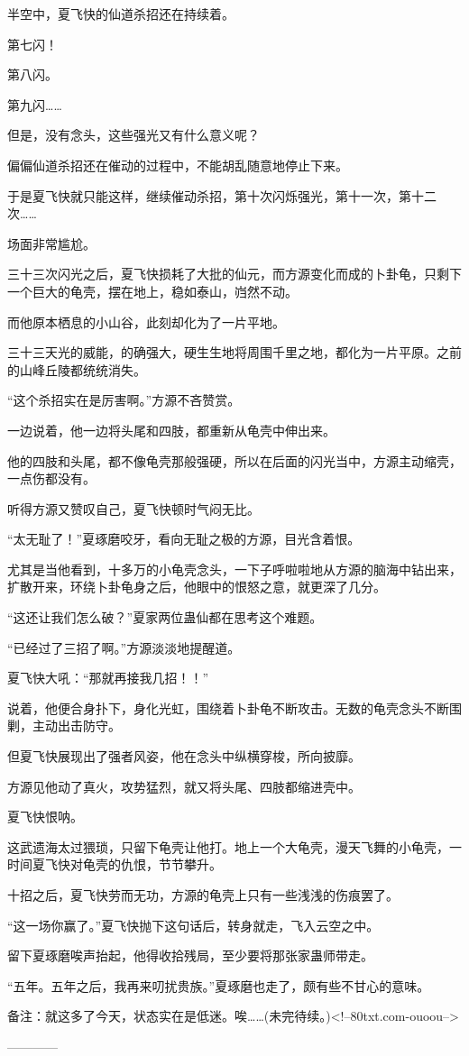 \begin{this_body}
半空中，夏飞快的仙道杀招还在持续着。

第七闪！

第八闪。

第九闪……

但是，没有念头，这些强光又有什么意义呢？

偏偏仙道杀招还在催动的过程中，不能胡乱随意地停止下来。

于是夏飞快就只能这样，继续催动杀招，第十次闪烁强光，第十一次，第十二次……

场面非常尴尬。

三十三次闪光之后，夏飞快损耗了大批的仙元，而方源变化而成的卜卦龟，只剩下一个巨大的龟壳，摆在地上，稳如泰山，岿然不动。

而他原本栖息的小山谷，此刻却化为了一片平地。

三十三天光的威能，的确强大，硬生生地将周围千里之地，都化为一片平原。之前的山峰丘陵都统统消失。

“这个杀招实在是厉害啊。”方源不吝赞赏。

一边说着，他一边将头尾和四肢，都重新从龟壳中伸出来。

他的四肢和头尾，都不像龟壳那般强硬，所以在后面的闪光当中，方源主动缩壳，一点伤都没有。

听得方源又赞叹自己，夏飞快顿时气闷无比。

“太无耻了！”夏琢磨咬牙，看向无耻之极的方源，目光含着恨。

尤其是当他看到，十多万的小龟壳念头，一下子呼啦啦地从方源的脑海中钻出来，扩散开来，环绕卜卦龟身之后，他眼中的恨怒之意，就更深了几分。

“这还让我们怎么破？”夏家两位蛊仙都在思考这个难题。

“已经过了三招了啊。”方源淡淡地提醒道。

夏飞快大吼：“那就再接我几招！！”

说着，他便合身扑下，身化光虹，围绕着卜卦龟不断攻击。无数的龟壳念头不断围剿，主动出击防守。

但夏飞快展现出了强者风姿，他在念头中纵横穿梭，所向披靡。

方源见他动了真火，攻势猛烈，就又将头尾、四肢都缩进壳中。

夏飞快恨呐。

这武遗海太过猥琐，只留下龟壳让他打。地上一个大龟壳，漫天飞舞的小龟壳，一时间夏飞快对龟壳的仇恨，节节攀升。

十招之后，夏飞快劳而无功，方源的龟壳上只有一些浅浅的伤痕罢了。

“这一场你赢了。”夏飞快抛下这句话后，转身就走，飞入云空之中。

留下夏琢磨唉声抬起，他得收拾残局，至少要将那张家蛊师带走。

“五年。五年之后，我再来叨扰贵族。”夏琢磨也走了，颇有些不甘心的意味。

备注：就这多了今天，状态实在是低迷。唉……(未完待续。)<!--80txt.com-ouoou-->

------------

\end{this_body}


